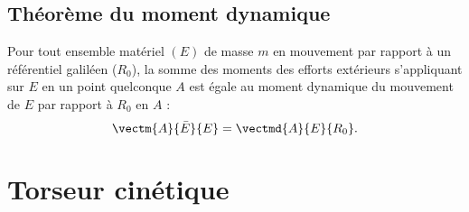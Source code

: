 
\subsection{Théorème du moment dynamique}
\begin{theoreme}
			Pour tout ensemble matériel $(E)$ de masse $m$ en mouvement par rapport à un référentiel galiléen ($R_0$), la somme des moments des efforts extérieurs s'appliquant sur $E$ en un point quelconque $A$ est égale au moment dynamique du mouvement de $E$ par rapport à $R_0$ en $A$ :
			$$
				\vectm{A}{\bar E}{E}=\vectmd{A}{E}{R_0}.
			$$
		\end{theoreme}

%
%
%

\section{Torseur cinétique }

